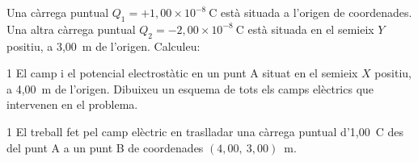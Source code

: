 Una càrrega puntual $Q_1 = +1,00\times 10^{-8}\ \mathrm{C}$ està situada a l'origen de coordenades. Una altra càrrega puntual $Q_2 = -2,00\times 10^{-8}\ \mathrm{C}$ està situada en el semieix $Y$ positiu, a 3,00~m de l'origen. Calculeu:

\begin{apartat}{1}
El camp i el potencial electrostàtic en un punt A situat en el semieix $X$ positiu, a 4,00~m de l'origen. Dibuixeu un esquema de tots els camps elèctrics que intervenen en el problema.
\end{apartat}

\begin{apartat}{1}
El treball fet pel camp elèctric en traslladar una càrrega puntual d'1,00~C des del punt A a un punt B de coordenades $(4,00,\ 3,00)$~m.
\end{apartat}

